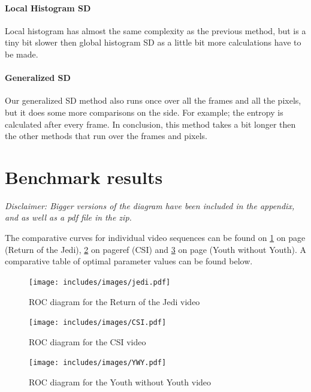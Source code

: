 \documentclass[a4paper,10pt]{article}
\begin{document}
\paragraph{Local Histogram SD} Local histogram has almost the same complexity as the previous method, but is a tiny bit slower then global histogram SD as a little bit more calculations have to be made.

\paragraph{Generalized SD} Our generalized SD method also runs once over all the frames and all the pixels, but it does some more comparisons on the side. For example; the entropy is calculated after every frame. In conclusion, this method takes a bit longer then the other methods that run over the frames and pixels.


\section{Benchmark results}
\textit{Disclaimer: Bigger versions of the diagram have been included in the appendix, and as well as a pdf file in the zip.}

The comparative curves for individual video sequences can be found on \ref{jedi} on page \pageref{jedi} (Return of the Jedi), \ref{csi} on pageref \pageref{csi} (CSI) and \ref{ywy} on page \pageref{ywy} (Youth without Youth). A comparative table of optimal parameter values can be found below.

\begin{figure}[ht!]
	\centering
	\texttt{[image: includes/images/jedi.pdf]}
	\caption{ROC diagram for the Return of the Jedi video}
	\label{jedi}
\end{figure}


\begin{figure}[ht!]
	\centering
	\texttt{[image: includes/images/CSI.pdf]}
	\caption{ROC diagram for the CSI video}
	\label{csi}
\end{figure}


\begin{figure}[ht!]
	\centering
	\texttt{[image: includes/images/YWY.pdf]}
	\caption{ROC diagram for the Youth without Youth video}
	\label{ywy}
\end{figure}
\end{document}
